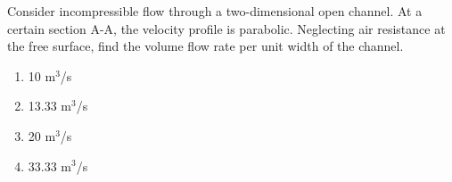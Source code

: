 \item Consider incompressible flow through a two-dimensional open channel. At a certain section A-A, the velocity profile is parabolic. Neglecting air resistance at the free surface, find the volume flow rate per unit width of the channel.
 \begin{figure}[!ht]
\centering
\resizebox{0.5\textwidth}{!}{%

}%
\end{figure}
 \begin{enumerate}
    \item 10 $\text{m}^3$/s
    \item 13.33 $\text{m}^3$/s
    \item 20 $\text{m}^3$/s
    \item 33.33 $\text{m}^3$/s \\
\end{enumerate}
